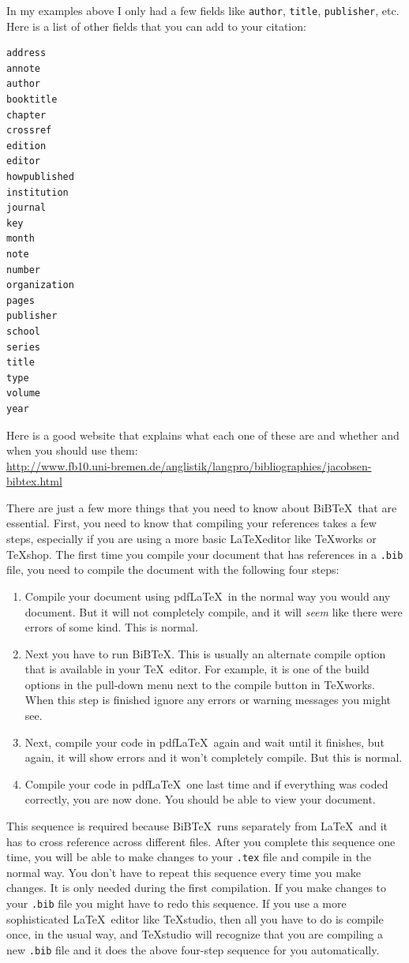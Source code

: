 \documentclass{article}
\newcommand{\nid}{\noindent} %
\begin{document}
In my examples above I only had a few fields like \texttt{author}, \texttt{title}, \texttt{publisher}, etc.  Here is a list of other fields that you can add to your citation:
\begin{multicols}{3}
\begin{verbatim}
address
annote
author
booktitle
chapter
crossref
edition
editor
howpublished
institution
journal
key
month
note
number
organization
pages
publisher
school
series
title
type
volume
year
\end{verbatim}
\end{multicols}

\nid Here is a good website that explains what each one of these are and whether and when you should use them:\\
\url{http://www.fb10.uni-bremen.de/anglistik/langpro/bibliographies/jacobsen-bibtex.html}

There are just a few more things that you need to know about BiB\TeX\ that are essential.  First, you need to know that compiling your references takes a few steps, especially if you are using a more basic \LaTeX editor like \TeX works or \TeX shop.  The first time you compile your document that has references in a \verb|.bib| file, you need to compile the document with the following four steps:
\begin{enumerate}
\item Compile your document using pdf\LaTeX\ in the normal way you would any document.  But it will not completely compile, and it will \emph{seem} like there were errors of some kind.  This is normal.
\item Next you have to run BiB\TeX. This is usually an alternate compile option that is available in your \TeX\ editor.  For example, it is one of the build options in the pull-down menu next to the compile button in \TeX works.  When this step is finished ignore any errors or warning messages you might see.  
\item Next, compile your code in pdf\LaTeX\ again and wait until it finishes, but again, it will show errors and it won't completely compile.  But this is normal.
\item Compile your code in pdf\LaTeX\ one last time and if everything was coded correctly, you are now done.  You should be able to view your document. 
\end{enumerate} 

This sequence is required because BiB\TeX\ runs separately from \LaTeX\ and it has to cross reference across different files.  After you complete this sequence one time, you will be able to make changes to your \verb|.tex| file and compile in the normal way.  You don't have to repeat this sequence every time you make changes.  It is only needed during the first compilation. If you make changes to your \verb|.bib| file you might have to redo this sequence. If you use a more sophisticated \LaTeX\ editor like \TeX studio, then all you have to do is compile once, in the usual way, and \TeX studio will recognize that you are compiling a new \verb|.bib| file and it does the above four-step sequence for you automatically.
\end{document}
